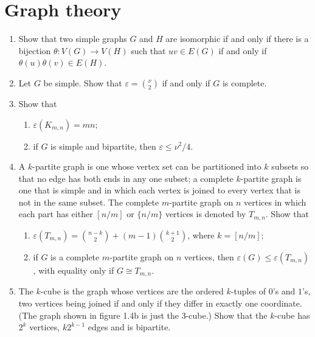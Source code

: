 \documentclass{article}
\theoremstyle{remark}
\begin{document}
\section*{Graph theory}
    \begin{enumerate}
        \item Show that two simple graphs \( G \) and \( H \) are isomorphic if and only if there is a bijection \( \theta : V(G) \to V(H) \) such that \( uv \in E(G) \) if and only if \( \theta(u)\theta(v) \in E(H) \).
        
        \item Let \( G \) be simple. Show that \( \varepsilon = \binom{\nu}{2} \) if and only if \( G \) is complete.
        
        \item
        Show that
        \begin{enumerate}
            \item \( \varepsilon (K_{m,n}) = mn; \)
            \item if \( G \) is simple and bipartite, then \( \varepsilon \leq \nu^2 / 4 \).
        \end{enumerate}
        
        \item
        A \( k \)-partite graph is one whose vertex set can be partitioned into \( k \) subsets so that no edge has both ends in any one subset; a complete \( k \)-partite graph is one that is simple and in which each vertex is joined to every vertex that is not in the same subset. The complete \( m \)-partite graph on \( n \) vertices in which each part has either \([n/m]\) or \(\{n/m\}\) vertices is denoted by \( T_{m,n} \). Show that
        \begin{enumerate}
            \item \( \varepsilon (T_{m,n}) = \binom{n-k}{2} + (m-1) \binom{k+1}{2} \), where \( k = [n/m]; \)
            \item if \( G \) is a complete \( m \)-partite graph on \( n \) vertices, then \( \varepsilon (G) \leq \varepsilon (T_{m,n}) \), with equality only if \( G \cong T_{m,n} \).
        \end{enumerate}
        
        \item
        The \( k \)-cube is the graph whose vertices are the ordered \( k \)-tuples of \( 0 \)'s and \( 1 \)'s, two vertices being joined if and only if they differ in exactly one coordinate. (The graph shown in figure 1.4b is just the 3-cube.) Show that the \( k \)-cube has \( 2^k \) vertices, \( k2^{k-1} \) edges and is bipartite.
        

\end{enumerate}
\end{document}
